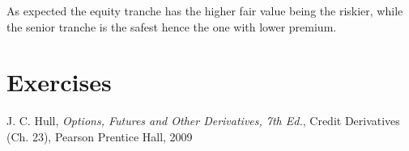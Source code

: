 As expected the equity tranche has the higher fair value being the riskier, while the senior tranche is the safest hence the one with lower premium.

\section*{Exercises}


\begin{thebibliography}{9}
 J. C. Hull, \emph{Options, Futures and Other Derivatives, 7th Ed.}, Credit Derivatives (Ch. 23), Pearson Prentice Hall, 2009
\end{thebibliography}
